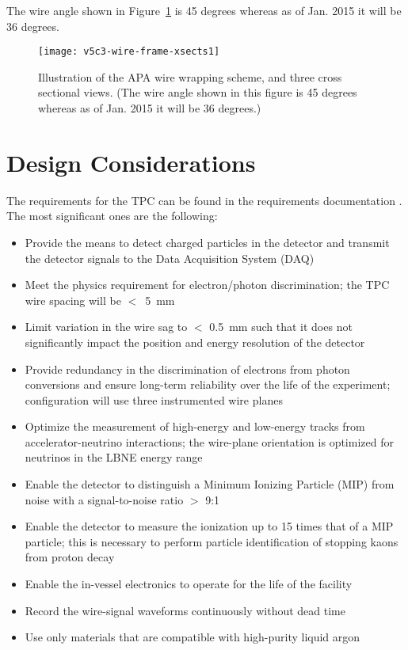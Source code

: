 \notestart
The wire angle shown in Figure~\ref{fig:tpc-wire-frame-xsect} is 45 degrees whereas as of Jan. 2015 it will be 36 degrees.
\notestop

\begin{figure}[htpb]
\centering
\texttt{[image: v5c3-wire-frame-xsects1]}
\caption[Illustration of the APA wire wrapping scheme]{Illustration of the APA wire wrapping scheme, and three cross sectional views. (The wire angle shown in this figure is 45 degrees whereas as of Jan. 2015 it will be 36 degrees.)} 
\label{fig:tpc-wire-frame-xsect}
\end{figure}

\section{Design Considerations} 
\label{sec:v5-tpc-reqs-n-specs}

The requirements for the TPC can be found in the requirements documentation \cite{lar-fd-req}. The most significant ones are the following:

\begin{itemize}	
\item Provide the means to detect charged particles in the detector and transmit the detector signals to the Data Acquisition System (DAQ)
\item Meet the physics requirement for electron/photon discrimination;  the TPC wire spacing will be $<$~5~mm
\item Limit variation in the wire sag to $<$ 0.5~mm such that it does not significantly impact the position and energy resolution of the detector
\item Provide redundancy in the discrimination of electrons from photon conversions and ensure long-term reliability over the life of the experiment;  configuration will use three instrumented wire planes
\item Optimize the measurement of high-energy and low-energy tracks from accelerator-neutrino interactions; the wire-plane orientation is optimized for neutrinos in the LBNE energy range
\item Enable the detector to distinguish a Minimum Ionizing Particle (MIP) from noise with a signal-to-noise ratio $>$ 9:1
\item Enable the detector to measure the ionization up to 15 times that of a MIP particle; this is necessary to perform particle identification of stopping kaons from proton decay
\item Enable the in-vessel electronics to operate for the life of the facility
\item Record the wire-signal waveforms continuously without dead time
\item Use only materials that are compatible with high-purity liquid argon

\end{itemize}

